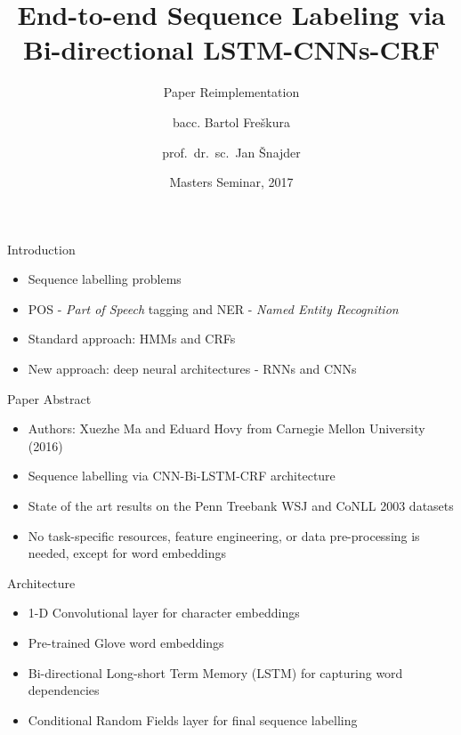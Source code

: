 \documentclass{beamer}
\title{End-to-end Sequence Labeling via Bi-directional
LSTM-CNNs-CRF}
\subtitle{Paper Reimplementation}
\author{bacc. Bartol Freškura\inst{1} \and prof.~dr.~sc.~Jan Šnajder\inst{2}}
\institute[Faculty of Electrical Engineering and Computing] %
{
  \inst{1}%
  Author\\
  Faculty of Electrical Engineering and Computing
  \and
  \inst{2}%
  Mentor\\
  Faculty of Electrical Engineering and Computing
}
\date{Masters Seminar, 2017}
\begin{document}
\begin{frame}
  \titlepage
\end{frame}


\begin{frame}{Introduction}
  \begin{itemize}
  \item {
    Sequence labelling problems
  }
  \item {
      POS - \textit{Part of Speech} tagging and NER - \textit{Named Entity Recognition}
  }
  \item {
    Standard approach: HMMs and CRFs
  }
  \item{
   New approach: deep neural architectures - RNNs and CNNs
  }
  \end{itemize}
\end{frame}


\begin{frame}{Paper Abstract}
    \begin{itemize}
    \item{
            Authors: Xuezhe Ma and Eduard Hovy from Carnegie Mellon University
            (2016)
        }
        \item{
            Sequence labelling via CNN-Bi-LSTM-CRF architecture
            }
        \item{
            State of the art results on the Penn Treebank WSJ and CoNLL 2003 datasets
            }
        \item{
            No task-specific resources, feature engineering, or data pre-processing is
            needed, except for word embeddings
        }
  \end{itemize}
\end{frame}


\begin{frame}{Architecture}
    \begin{itemize}
        \item{
            1-D Convolutional layer for character embeddings
            }
        \item{
            Pre-trained Glove word embeddings
            }
        \item{
            Bi-directional Long-short Term Memory (LSTM) for capturing word
            dependencies
            }
        \item{
            Conditional Random Fields layer for final sequence labelling
        }
  \end{itemize}
\end{frame}
\end{document}
